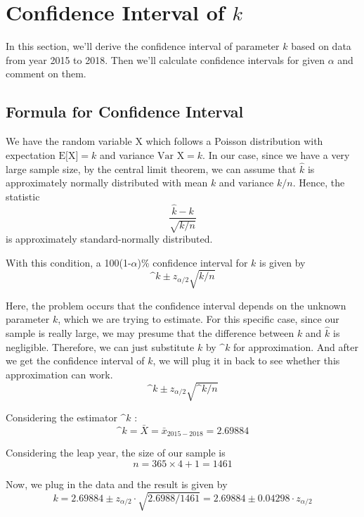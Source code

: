 \documentclass[a4paper]{article}
\begin{document}
{{\newpage
\section{Confidence Interval of $k$}%
\par{In this section, we'll derive the confidence interval of parameter $k$ based on data from year 2015 to 2018. Then we'll calculate confidence intervals for given $\alpha$ and comment on them.}
\subsection{Formula for Confidence Interval}
\par{We have the random variable X which follows a Poisson distribution with expectation $\textrm{E[X]}=k$ and variance $\textrm{Var X}=k$. In our case, since we have a very large sample size, by the central limit theorem, we can assume that $\hat{k}$ is approximately normally distributed with mean $k$ and variance $k/n$. Hence, the statistic}
\begin{equation*}
    \frac{\hat{k}-k}{\sqrt{k/n}}
\end{equation*}
is approximately standard-normally distributed.
\par{With this condition, a 100(1-$\alpha$)\% confidence interval for $k$ is given by}
\begin{equation*}
\^{k}\pm z_{\alpha/2}\sqrt{k/n}
\end{equation*}
\par{Here, the problem occurs that the confidence interval depends on the unknown parameter $k$, which we are trying to estimate. For this specific case, since our sample is really large, we may presume that the difference between $k$ and $\hat{k}$ is negligible. Therefore, we can just substitute $k$ by $\^{k}$ for approximation. And after we get the confidence interval of $k$, we will plug it in back to see whether this approximation can work.}
\begin{equation}
\^{k}\pm z_{\alpha/2}\sqrt{\^{k}/n}
\end{equation}
\par{Considering the estimator $\^{k}$ :}
\begin{equation*}
    \^{k} = \bar{X} = \bar{x}_{2015-2018} =  2.69884
\end{equation*}
\par{Considering the leap year, the size of our sample is}
\begin{equation*}
    n = 365 \times 4 + 1 =  1461
\end{equation*}
\par{Now, we plug in the data and the result is given by}
\begin{equation}
    k=2.69884\pm z_{\alpha/2}\cdot \sqrt{2.6988/1461}=2.69884\pm 0.04298\cdot z_{\alpha/2}
\end{equation}
}}
\end{document}
